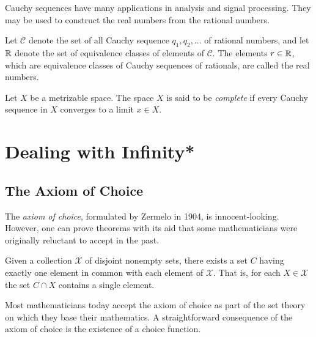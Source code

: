 Cauchy sequences have many applications in analysis and signal processing.
They may be used to construct the real numbers from the rational numbers.

\begin{definition}
Let $\mathcal{C}$ denote the set of all Cauchy sequence $q_1, q_2, \ldots$ of rational numbers, and let $\mathbb{R}$ denote the set of equivalence classes of elements of $\mathcal{C}$.
The elements $r \in \mathbb{R}$, which are equivalence classes of Cauchy sequences of rationals, are called the real numbers.
\end{definition}

\begin{definition}[Completeness]
Let $X$ be a metrizable space.
The space $X$ is said to be \emph{complete} if every Cauchy sequence in $X$ converges to a limit $x \in X$.
\end{definition}


\section{Dealing with Infinity*}

\subsection{The Axiom of Choice}

The \emph{axiom of choice}, formulated by Zermelo in 1904, is innocent-looking.
However, one can prove theorems with its aid that some mathematicians were originally reluctant to accept in the past.

\begin{definition}
Given a collection $\mathcal{X}$ of disjoint nonempty sets, there exists a set $C$ having exactly one element in common with each element of $\mathcal{X}$.
That is, for each $X \in \mathcal{X}$ the set $C \cap X$ contains a single element.
\end{definition}

Most mathematicians today accept the axiom of choice as part of the set theory on which they base their mathematics.
A straightforward consequence of the axiom of choice is the existence of a choice function.

